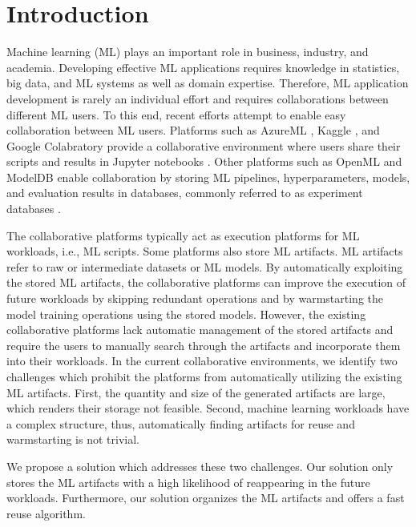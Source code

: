 \section{Introduction} \label{sec-introduction}
Machine learning (ML) plays an important role in business, industry, and academia. 
Developing effective ML applications requires knowledge in statistics, big data, and ML systems as well as domain expertise.
Therefore, ML application development is rarely an individual effort and requires collaborations between different ML users.
To this end, recent efforts attempt to enable easy collaboration between ML users.
Platforms such as AzureML \cite{team2016azureml}, Kaggle \cite{kagglewebsite}, and Google Colabratory \cite{googlecolab} provide a collaborative environment where users share their scripts and results in Jupyter notebooks \cite{Kluyver:2016aa}.
Other platforms such as OpenML \cite{vanschoren2014openml} and ModelDB \cite{vartak2016m} enable collaboration by storing ML pipelines, hyperparameters, models, and evaluation results in databases, commonly referred to as experiment databases \cite{Vanschoren2012}.

The collaborative platforms typically act as execution platforms for ML workloads, i.e., ML scripts.
Some platforms also store ML artifacts.
ML artifacts refer to raw or intermediate datasets or ML models.
By automatically exploiting the stored ML artifacts, the collaborative platforms can improve the execution of future workloads by skipping redundant operations and by warmstarting the model training operations using the stored models.
However, the existing collaborative platforms lack automatic management of the stored artifacts and require the users to manually search through the artifacts and incorporate them into their workloads.
In the current collaborative environments, we identify two challenges which prohibit the platforms from automatically utilizing the existing ML artifacts.
First, the quantity and size of the generated artifacts are large, which renders their storage not feasible.
Second, machine learning workloads have a complex structure, thus, automatically finding artifacts for reuse and warmstarting is not trivial.

We propose a solution which addresses these two challenges.
Our solution only stores the ML artifacts with a high likelihood of reappearing in the future workloads.
Furthermore, our solution organizes the ML artifacts and offers a fast reuse algorithm.

